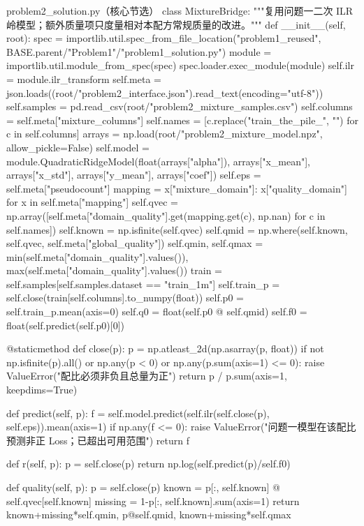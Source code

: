 \documentclass[bwprint]{gmcmthesis}
\numberwithin{equation}{section}
\numberwithin{figure}{section}
\numberwithin{table}{section}
\begin{document}
\begin{Python}{problem2\_solution.py（核心节选）}
class MixtureBridge:
    """复用问题一二次 ILR 岭模型；额外质量项只度量相对本配方常规质量的改进。"""
    def __init__(self, root):
        spec = importlib.util.spec_from_file_location("problem1_reused", BASE.parent/"Problem1"/"problem1_solution.py")
        module = importlib.util.module_from_spec(spec)
        spec.loader.exec_module(module)
        self.ilr = module.ilr_transform
        self.meta = json.loads((root/"problem2_interface.json").read_text(encoding="utf-8"))
        self.samples = pd.read_csv(root/"problem2_mixture_samples.csv")
        self.columns = self.meta["mixture_columns"]
        self.names = [c.replace("train_the_pile_", "") for c in self.columns]
        arrays = np.load(root/"problem2_mixture_model.npz", allow_pickle=False)
        self.model = module.QuadraticRidgeModel(float(arrays["alpha"]), arrays["x_mean"], arrays["x_std"], arrays["y_mean"], arrays["coef"])
        self.eps = self.meta["pseudocount"]
        mapping = {x["mixture_domain"]: x["quality_domain"] for x in self.meta["mapping"]}
        self.qvec = np.array([self.meta["domain_quality"].get(mapping.get(c), np.nan) for c in self.names])
        self.known = np.isfinite(self.qvec)
        self.qmid = np.where(self.known, self.qvec, self.meta["global_quality"])
        self.qmin, self.qmax = min(self.meta["domain_quality"].values()), max(self.meta["domain_quality"].values())
        train = self.samples[self.samples.dataset == "train_1m"]
        self.train_p = self.close(train[self.columns].to_numpy(float))
        self.p0 = self.train_p.mean(axis=0)
        self.q0 = float(self.p0 @ self.qmid)
        self.f0 = float(self.predict(self.p0)[0])

    @staticmethod
    def close(p):
        p = np.atleast_2d(np.asarray(p, float))
        if not np.isfinite(p).all() or np.any(p < 0) or np.any(p.sum(axis=1) <= 0):
            raise ValueError("配比必须非负且总量为正")
        return p / p.sum(axis=1, keepdims=True)

    def predict(self, p):
        f = self.model.predict(self.ilr(self.close(p), self.eps)).mean(axis=1)
        if np.any(f <= 0):
            raise ValueError("问题一模型在该配比预测非正 Loss；已超出可用范围")
        return f

    def r(self, p):
        p = self.close(p)
        return np.log(self.predict(p)/self.f0)

    def quality(self, p):
        p = self.close(p)
        known = p[:, self.known] @ self.qvec[self.known]
        missing = 1-p[:, self.known].sum(axis=1)
        return known+missing*self.qmin, p@self.qmid, known+missing*self.qmax


\end{Python}
\end{document}
